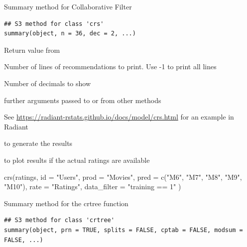 \documentclass[a4paper]{book}
\begin{document}
%
\begin{Description}
Summary method for Collaborative Filter
\end{Description}
%
\begin{Usage}
\begin{verbatim}
## S3 method for class 'crs'
summary(object, n = 36, dec = 2, ...)
\end{verbatim}
\end{Usage}
%
\begin{Arguments}
\begin{ldescription}
\item[\code{object}] Return value from 

\item[\code{n}] Number of lines of recommendations to print. Use -1 to print all lines

\item[\code{dec}] Number of decimals to show

\item[\code{...}] further arguments passed to or from other methods
\end{ldescription}
\end{Arguments}
%
\begin{Details}
See \url{https://radiant-rstats.github.io/docs/model/crs.html} for an example in Radiant
\end{Details}
%
\begin{SeeAlso}
 to generate the results

 to plot results if the actual ratings are available
\end{SeeAlso}
%
\begin{Examples}
\begin{ExampleCode}
crs(ratings,
  id = "Users", prod = "Movies", pred = c("M6", "M7", "M8", "M9", "M10"),
  rate = "Ratings", data_filter = "training == 1"
) %
\end{ExampleCode}
\end{Examples}
%
\begin{Description}
Summary method for the crtree function
\end{Description}
%
\begin{Usage}
\begin{verbatim}
## S3 method for class 'crtree'
summary(object, prn = TRUE, splits = FALSE, cptab = FALSE, modsum = FALSE, ...)
\end{verbatim}
\end{Usage}
\end{document}
